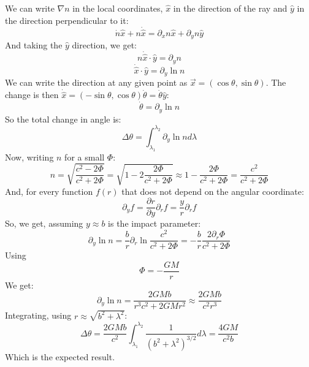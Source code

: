 \documentclass{article}
\begin{document}
We can write $\nabla n$ in the local coordinates, $\hat{x}$ in the direction of the ray and $\hat{y}$ in the direction perpendicular to it:
\begin{equation}
    \dot{n}\hat{x} + n\dot{\hat{x}} = \partial_x n \hat{x} + \partial_y n \hat{y}
\end{equation}
And taking the $\hat{y}$ direction, we get:
\begin{equation}
    n\dot{\hat{x}}\cdot \hat{y} = \partial_y n
\end{equation}
\begin{equation}
    \dot{\hat{x}}\cdot \hat{y} = \partial_y \ln n
\end{equation}
We can write the direction at any given point as $\vec{x} = (\cos\theta, \sin\theta)$. The change is then $\dot{\hat{x}} = (-\sin\theta, \cos\theta)\dot{\theta} = \dot{\theta}\hat{y}$:
\begin{equation}
    \dot{\theta} = \partial_y \ln n
\end{equation}
So the total change in angle is:
\begin{equation}
    \Delta \theta = \int_{\lambda_1}^{\lambda_2} \partial_y \ln n d\lambda
\end{equation}
Now, writing $n$ for a small $\Phi$:
\begin{equation}
    n = \sqrt{\frac{c^2 - 2\Phi}{c^2 + 2\Phi}} = \sqrt{1 - 2\frac{2\Phi}{c^2 + 2\Phi}} \approx 1 - \frac{2\Phi}{c^2 + 2\Phi} = \frac{c^2}{c^2 + 2\Phi}
\end{equation}
And, for every function $f(r)$ that does not depend on the angular coordinate:
\begin{equation}
    \partial_y f = \frac{\partial r}{\partial y}\partial_r f = \frac{y}{r} \partial_r f
\end{equation}
So, we get, assuming $y \approx b$ is the impact parameter:
\begin{equation}
    \partial_y \ln n = \frac{b}{r}\partial_r \ln \frac{c^2}{c^2 + 2\Phi} = -\frac{b}{r}\frac{2\partial_r\Phi}{c^2 + 2\Phi} 
\end{equation}
Using
\begin{equation}
    \Phi = -\frac{GM}{r}
\end{equation}
We get:
\begin{equation}
    \partial_y \ln n = \frac{2GMb}{r^3c^2 + 2GMr^2} \approx \frac{2GMb}{c^2r^3}
\end{equation}
Integrating, using $r \approx \sqrt{b^2 + \lambda^2}$:
\begin{equation}
    \Delta \theta = \frac{2GMb}{c^2}\int_{\lambda_1}^{\lambda_2}\frac{1}{(b^2 + \lambda^2)^{3/2}} d\lambda = \frac{4GM}{c^2b}
\end{equation}
Which is the expected result.
\end{document}
